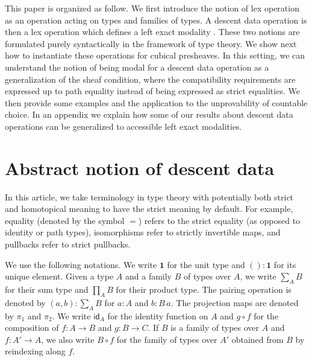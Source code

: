 \documentclass[10pt,a4paper,draft]{article}
\newcommand{\Unit}{\mathbf{1}}
\newcommand{\id}{\mathsf{id}}
\newcommand{\unit}{()} %
\renewcommand{\~}{\widetilde}
\theoremstyle{definition}
\theoremstyle{remark} %
\begin{document}
This paper is organized as follow. We first introduce the notion of
lex operation as an operation acting on types and families of types.
A descent data operation is then
a lex operation which defines a left exact modality \cite{HoTT,Quirin16,RijkeSS17}.
These two notions are formulated purely syntactically in the framework of type theory.
We show next how to instantiate these operations for cubical presheaves. In this setting,
we can understand the
notion of being modal for a descent data operation as a generalization of the sheaf condition,
where the compatibility requirements are expressed up to path equality instead of
being expressed as strict equalities. We then provide some examples and the application to
the unprovability of countable choice. In an appendix we explain how some
of our results about descent data operations can be generalized to accessible
left exact modalities.



\section{Abstract notion of descent data}

In this article, we take terminology in type theory with potentially both strict and homotopical meaning to have the strict meaning by default.
For example, equality (denoted by the symbol ${=}$) refers to the strict equality (as opposed to identity or path types), isomorphisms refer to strictly invertible maps, and pullbacks refer to strict pullbacks.

We use the following notations.
We write $\Unit$ for the unit type and $\unit : \Unit$ for its unique element.
Given a type $A$ and a family $B$ of types over $A$, we write $\sum_A B$ for their sum type and $\prod_A B$ for their product type.
The pairing operation is denoted by $(a, b) : \sum_A B$ for $a : A$ and $b : B\,a$.
The projection maps are denoted by $\pi_1$ and $\pi_2$.
We write $\id_A$ for the identity function on $A$ and $g\circ f$ for the composition of $f \colon A \to B$ and $g \colon B \to C$.
If $B$ is a family of types over $A$ and $f\colon A'\rightarrow A$, we also write $B\circ f$ for the family of types over $A'$ obtained from $B$ by reindexing along $f$.
\end{document}
